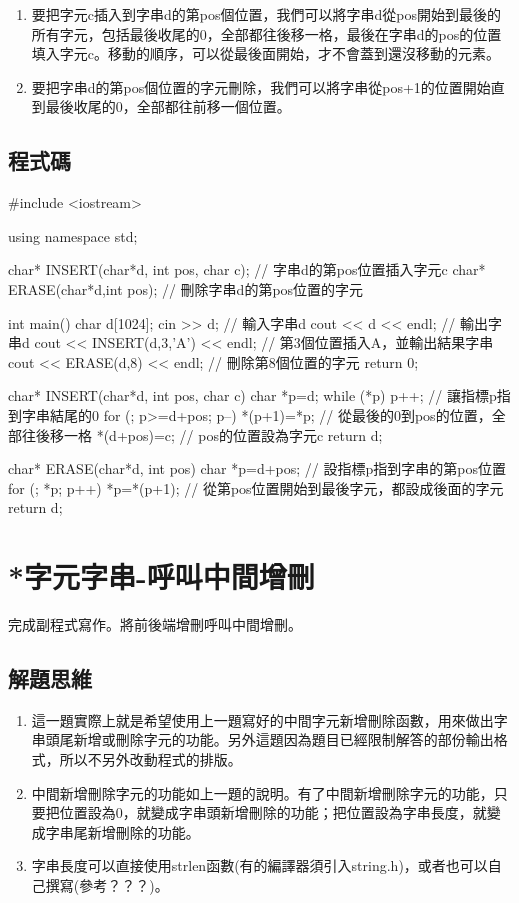 \vspace{0.3cm}
\begin{enumerate}
	\item 要把字元c插入到字串d的第pos個位置，我們可以將字串d從pos開始到最後的所有字元，包括最後收尾的0，全部都往後移一格，最後在字串d的pos的位置填入字元c。移動的順序，可以從最後面開始，才不會蓋到還沒移動的元素。
	\item 要把字串d的第pos個位置的字元刪除，我們可以將字串從pos+1的位置開始直到最後收尾的0，全部都往前移一個位置。
\end{enumerate}


\subsection{程式碼}
\begin{cppcode}
#include <iostream>

using namespace std; 

char* INSERT(char*d, int pos, char c); // 字串d的第pos位置插入字元c
char* ERASE(char*d,int pos); // 刪除字串d的第pos位置的字元

int main()
{ 
	char d[1024]; cin >> d; // 輸入字串d
	cout << d << endl; // 輸出字串d
	cout << INSERT(d,3,'A') << endl; // 第3個位置插入A，並輸出結果字串
	cout << ERASE(d,8) << endl; // 刪除第8個位置的字元
	return 0;
} 

char* INSERT(char*d, int pos, char c)
{
	char *p=d; while (*p) p++; // 讓指標p指到字串結尾的0
	for (; p>=d+pos; p--) *(p+1)=*p; // 從最後的0到pos的位置，全部往後移一格
	*(d+pos)=c; // pos的位置設為字元c
	return d;
}

char* ERASE(char*d, int pos)
{
	char *p=d+pos; // 設指標p指到字串的第pos位置
	for (; *p; p++) *p=*(p+1); // 從第pos位置開始到最後字元，都設成後面的字元
	return d;
}

\end{cppcode}

\section{*字元字串-呼叫中間增刪}
完成副程式寫作。將前後端增刪呼叫中間增刪。

\subsection{解題思維}

\vspace{0.3cm}
\begin{enumerate}
	\item 這一題實際上就是希望使用上一題寫好的中間字元新增刪除函數，用來做出字串頭尾新增或刪除字元的功能。另外這題因為題目已經限制解答的部份輸出格式，所以不另外改動程式的排版。
	\item 中間新增刪除字元的功能如上一題的說明。有了中間新增刪除字元的功能，只要把位置設為0，就變成字串頭新增刪除的功能；把位置設為字串長度，就變成字串尾新增刪除的功能。
	\item 字串長度可以直接使用strlen函數(有的編譯器須引入string.h)，或者也可以自己撰寫(參考？？？)。
\end{enumerate}


